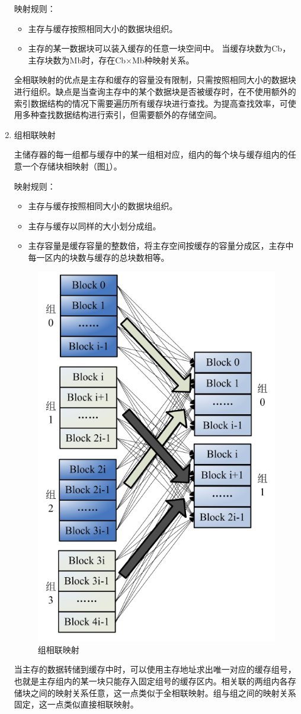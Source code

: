 \begin{enumerate}
映射规则：
\begin{itemize}
\item 主存与缓存按照相同大小的数据块组织。
\item 主存的某一数据块可以装入缓存的任意一块空间中。
当缓存块数为Cb，主存块数为Mb时，存在Cb×Mb种映射关系。
\end{itemize}

全相联映射的优点是主存和缓存的容量没有限制，只需按照相同大小的数据块进行组织。缺点是当查询主存中的某个数据块是否被缓存时，在不使用额外的索引数据结构的情况下需要遍历所有缓存块进行查找。为提高查找效率，可使用多种查找数据结构进行索引，但需要额外的存储空间。

\item 组相联映射

主储存器的每一组都与缓存中的某一组相对应，组内的每个块与缓存组内的任意一个存储块相映射（图\ref{fig:cache-map-3}）。

映射规则：
\begin{itemize}
\item 主存与缓存按照相同大小的数据块组织。
\item 主存与缓存以同样的大小划分成组。
\item 主存容量是缓存容量的整数倍，将主存空间按缓存的容量分成区，主存中每一区内的块数与缓存的总块数相等。
\end{itemize}

\begin{figure}[H]
\centering
\includegraphics[width=0.4\linewidth]{./graph/cache-map-3}
\caption{组相联映射}
\label{fig:cache-map-3}
\end{figure}

当主存的数据转储到缓存中时，可以使用主存地址求出唯一对应的缓存组号，也就是主存组内的某一块只能存入固定组号的缓存区内。相关联的两组内各存储块之间的映射关系任意，这一点类似于全相联映射。组与组之间的映射关系固定，这一点类似直接相联映射。

\end{enumerate}

